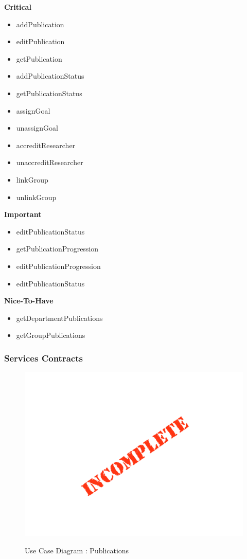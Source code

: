 \documentclass{article}
\begin{document}
			\begin{flushleft}
			\textbf{Critical}
				\begin{itemize}
	  				\item addPublication
	  				\item editPublication
	  				\item getPublication
	  				\item addPublicationStatus
	  				\item getPublicationStatus
	  				\item assignGoal
	  				\item unassignGoal
	  				\item accreditResearcher
	  				\item unaccreditResearcher
	  				\item linkGroup
	  				\item unlinkGroup
				\end{itemize}

			\textbf{Important}
				\begin{itemize}
	  				\item editPublicationStatus
	  				\item getPublicationProgression
	  				\item editPublicationProgression
	  				\item editPublicationStatus
				\end{itemize}

			\textbf{Nice-To-Have}
				\begin{itemize}
	  				\item getDepartmentPublications
	  				\item getGroupPublications
				\end{itemize}
		\end{flushleft}

		\subsubsection{Services Contracts}

		\begin{figure}[H]
		\includegraphics[width=\textwidth]{images/Incomplete.png}  \\
		\caption{Use Case Diagram : Publications}
		\end{figure}
\end{document}

